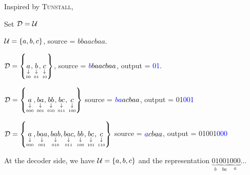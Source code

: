 Inspired by \textsc{Tunstall}, 

\begin{algorithm}
    \DontPrintSemicolon
    Set $\mathcal{D}=\mathcal{U}$\;
\end{algorithm}

\begin{example}
    $\mathcal{U} = \left\{ a,b,c \right\}$, source = $bbaacbaa$.
    
    $\mathcal{D} = \left\{ \underset{\underset{00}{\downarrow}}{a},\underset{\underset{01}{\downarrow}}{b},\underset{\underset{10}{\downarrow}}{c} \right\}$, source = $\textcolor{blue}{b}baacbaa$, output = \textcolor{blue}{01}.
    
    $\mathcal{D} = \left\{ \underset{\underset{000}{\downarrow}}{a},\underset{\underset{001}{\downarrow}}{ba},\underset{\underset{010}{\downarrow}}{bb},\underset{\underset{011}{\downarrow}}{bc},\underset{\underset{100}{\downarrow}}{c} \right\}$ source = $\textcolor{blue}{ba}acbaa$, output = 01\textcolor{blue}{001}
    
    $\mathcal{D} = \left\{ \underset{\underset{000}{\downarrow}}{a},\underset{\underset{001}{\downarrow}}{baa},\underset{\underset{010}{\downarrow}}{bab},\underset{\underset{011}{\downarrow}}{bac},\underset{\underset{100}{\downarrow}}{bb},\underset{\underset{101}{\downarrow}}{bc},\underset{\underset{110}{\downarrow}}{c} \right\}$ source = $\textcolor{blue}{a}cbaa$, output = 01001\textcolor{blue}{000}
    
    \bigskip    
    
    At the decoder side, we have $\mathcal{U} = \left\{ a,b,c \right\}$ and the representation $\underbrace{01}_b\underbrace{001}_{ba}\underbrace{000}_{a}\ldots$
    
    
\end{example}